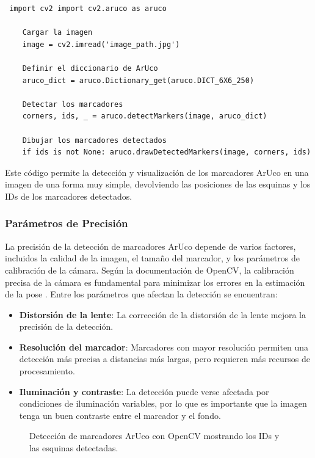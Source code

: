     \begin{verbatim} import cv2 import cv2.aruco as aruco

    Cargar la imagen
    image = cv2.imread('image_path.jpg')

    Definir el diccionario de ArUco
    aruco_dict = aruco.Dictionary_get(aruco.DICT_6X6_250)

    Detectar los marcadores
    corners, ids, _ = aruco.detectMarkers(image, aruco_dict)

    Dibujar los marcadores detectados
    if ids is not None: aruco.drawDetectedMarkers(image, corners, ids) \end{verbatim}

    Este código permite la detección y visualización de los marcadores ArUco en una imagen de una forma muy simple, devolviendo las posiciones de las esquinas y los IDs de los marcadores detectados.

    \subsubsection{Parámetros de Precisión}

    La precisión de la detección de marcadores ArUco depende de varios factores, incluidos la calidad de la imagen, el tamaño del marcador, y los parámetros de calibración de la cámara. Según la documentación de OpenCV, la calibración precisa de la cámara es fundamental para minimizar los errores en la estimación de la pose \cite{opencv_docs_aruco}. Entre los parámetros que afectan la detección se encuentran:

    \begin{itemize} \item \textbf{Distorsión de la lente}: La corrección de la distorsión de la lente mejora la precisión de la detección. \item \textbf{Resolución del marcador}: Marcadores con mayor resolución permiten una detección más precisa a distancias más largas, pero requieren más recursos de procesamiento. \item \textbf{Iluminación y contraste}: La detección puede verse afectada por condiciones de iluminación variables, por lo que es importante que la imagen tenga un buen contraste entre el marcador y el fondo. \end{itemize}

    \begin{figure}[h!] 
        \centering 
        \caption{Detección de marcadores ArUco con OpenCV mostrando los IDs y las esquinas detectadas.} 
        \label{fig} 
    \end{figure}


